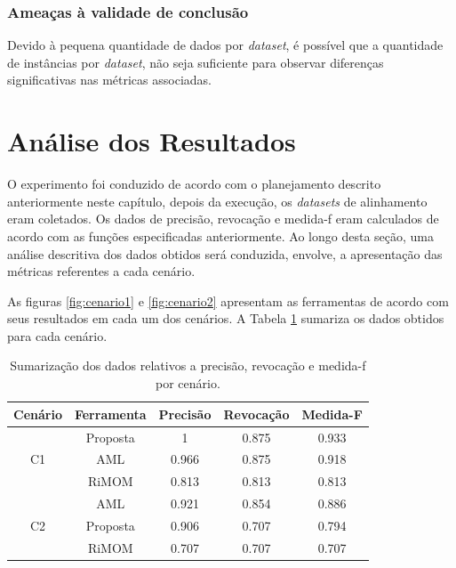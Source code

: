 \subsubsection{Ameaças à validade de conclusão}
Devido à pequena quantidade de dados por \textit{dataset}, é possível que a quantidade de instâncias por \textit{dataset}, não seja suficiente para observar diferenças significativas nas métricas associadas.

\section{Análise dos Resultados}
O experimento foi conduzido de acordo com o planejamento descrito anteriormente neste capítulo, depois da execução, os \textit{datasets} de alinhamento eram coletados. Os dados de precisão, revocação e medida-f eram calculados de acordo com as funções especificadas anteriormente.
Ao longo desta seção, uma análise descritiva dos dados obtidos será conduzida, envolve, a apresentação das métricas referentes a cada cenário.

As figuras \ref{fig:cenario1} e \ref{fig:cenario2} apresentam as ferramentas de acordo com seus resultados em cada um dos cenários. A Tabela \ref{tab:resultados} sumariza os dados obtidos para cada cenário.

\begin{table}[h]
	\centering
	\caption{Sumarização dos dados relativos a precisão, revocação e medida-f por cenário.}
	\label{tab:resultados}
	\begin{tabular}{|c|c|c|c|c|}
		\hline
		      Cenário       & Ferramenta & Precisão & Revocação & Medida-F \\ \hline
		\multirow{3}{*}{C1} &  Proposta  &    1     &   0.875   &  0.933   \\ \cline{2-5}
		                    &    AML     &  0.966   &   0.875   &  0.918   \\ \cline{2-5}
		                    &   RiMOM    &  0.813   &   0.813   &  0.813   \\ \hline
		\multirow{3}{*}{C2} &    AML     &  0.921   &   0.854   &  0.886   \\ \cline{2-5}
		                    &  Proposta  &  0.906   &   0.707   &  0.794   \\ \cline{2-5}
		                    &   RiMOM    &  0.707   &   0.707   &  0.707   \\ \hline
	\end{tabular}
\end{table}

